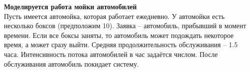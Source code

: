 \documentclass[14pt,fleqn]{extarticle}
\begin{document}
	\textbf{Моделируется работа мойки автомобилей}\\
	\newline
	Пусть имеется автомойка, которая работает ежедневно. У автомойки есть несколько боксов (предположим 10). Заявка -- автомобиль, прибывший в момент времени. Если все боксы заняты, то автомобиль может подождать некоторое время, а может сразу выйти. Средняя продолжительность обслуживания -- 1.5 часа. Интенсивность потока автомобилей в час задаётся числом. После обслуживания автомобиль покидает систему.
\end{document}
